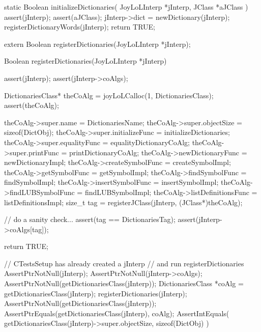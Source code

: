 \startCCode
static Boolean initializeDictionaries(
  JoyLoLInterp *jInterp,
  JClass       *aJClass
) {
  assert(jInterp);
  assert(aJClass);
  jInterp->dict = newDictionary(jInterp);
  registerDictionaryWords(jInterp);
  return TRUE;
}
\stopCCode

\startCHeader
extern Boolean registerDictionaries(JoyLoLInterp *jInterp);
\stopCHeader
{}

\startCCode
Boolean registerDictionaries(JoyLoLInterp *jInterp) {
  assert(jInterp);
  assert(jInterp->coAlgs);
  
  DictionariesClass* theCoAlg
    = joyLoLCalloc(1, DictionariesClass);
  assert(theCoAlg);
  
  theCoAlg->super.name           = DictionariesName;
  theCoAlg->super.objectSize     = sizeof(DictObj);
  theCoAlg->super.initializeFunc = initializeDictionaries;
  theCoAlg->super.equalityFunc   = equalityDictionaryCoAlg;
  theCoAlg->super.printFunc      = printDictionaryCoAlg;
  theCoAlg->newDictionaryFunc = newDictionaryImpl;
  theCoAlg->createSymbolFunc      = createSymbolImpl;
  theCoAlg->getSymbolFunc         = getSymbolImpl;
  theCoAlg->findSymbolFunc        = findSymbolImpl;
  theCoAlg->insertSymbolFunc      = insertSymbolImpl;
  theCoAlg->findLUBSymbolFunc     = findLUBSymbolImpl;
  theCoAlg->listDefinitionsFunc   = listDefinitionsImpl;  
  size_t tag =
    registerJClass(jInterp, (JClass*)theCoAlg);
  
  // do a sanity check...
  assert(tag == DictionariesTag);
  assert(jInterp->coAlgs[tag]);
   
  return TRUE;
}
\stopCCode


\startCTest
  // CTestsSetup has already created a jInterp
  // and run registerDictionaries
  AssertPtrNotNull(jInterp);
  AssertPtrNotNull(jInterp->coAlgs);
  AssertPtrNotNull(getDictionariesClass(jInterp));
  DictionariesClass *coAlg = getDictionariesClass(jInterp);
  registerDictionaries(jInterp);
  AssertPtrNotNull(getDictionariesClass(jInterp));
  AssertPtrEquals(getDictionariesClass(jInterp), coAlg);
  AssertIntEquals(
    getDictionariesClass(jInterp)->super.objectSize,
    sizeof(DictObj)
  )
\stopCTest
\stopTestCase
\stopTestSuite
